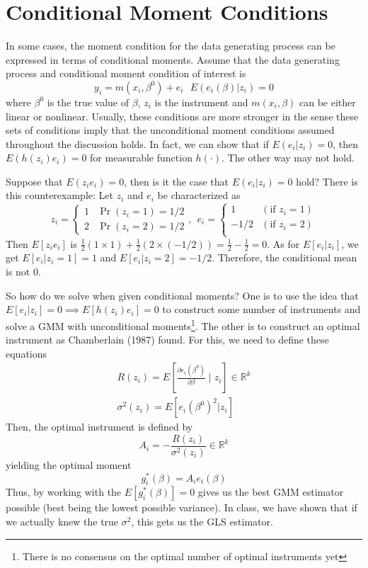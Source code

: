 \section{Conditional Moment Conditions}
In some cases, the moment condition for the data generating process can be expressed in terms of conditional moments. Assume that the data generating process and conditional moment condition of interest is
\[ 
y_i =m( x_i,\beta^0 )+ e_i \ \ \ E(e_i(\beta)|z_i)=0
\]
where $\beta^0$ is the true value of $\beta$, $z_i$ is the instrument and $m(x_i,\beta)$ can be either linear or nonlinear. Usually, these conditions are more stronger in the sense these sets of conditions imply that the unconditional moment conditions assumed throughout the discussion holds. In fact, we can show that if $E(e_i|z_i)=0$, then $E(h(z_i)e_i)=0$ for measurable function $h(\cdot)$. The other way may not hold.
\begin{mdframed}[backgroundcolor=yellow!5] 
\begin{example} Suppose that $E(z_ie_i)=0$, then is it the case that $E(e_i|z_i)=0$ hold? There is this counterexample: Let $z_i$ and $e_i$ be characterized as
\[
z_i=\begin{cases} 1 & \Pr(z_i=1)=1/2 \\ 2 & \Pr(z_i=2)=1/2 \end{cases}, \ \  e_i = \begin{cases} 1 & (\text{if }z_i=1)\\ -1/2 & (\text{if }z_i=2)\\\end{cases}
\]
Then $E[z_ie_i]$  is $\frac{1}{2}(1\times 1) +  \frac{1}{2}(2\times (-1/2))= \frac{1}{2}-\frac{1}{2}=0$. As for $E[e_i|z_i]$, we get $E[e_i|z_i=1]=1$ and $E[e_i|z_i=2]=-1/2$. Therefore, the conditional mean is not 0. 
\end{example}
\end{mdframed} \par
So how do we solve when given conditional moments? One is to use the idea that $E[e_i|z_i]=0\implies E[h(z_i)e_i]=0$ to construct some number of instruments and solve a GMM with unconditional moments\footnote{There is no consensus on the optimal number of optimal instruments yet}.  The other is to construct an optimal instrument as Chamberlain (1987) found. For this, we need to define these equations
\begin{gather*}
R(z_i) = E\left[\frac{\partial e_i(\beta^0)}{\partial \beta}\mid z_i\right] \in\mathbb{R}^k \\
\sigma^2(z_i) = E[e_i(\beta^0)^2|z_i]
\end{gather*}
Then, the optimal instrument is defined by
\[
A_i = -\frac{R(z_i)}{\sigma^2(z_i)}\in\mathbb{R}^k
\]
yielding the optimal moment
\[
g^*_i(\beta) = A_i e_i(\beta)
\]
Thus, by working with the $E[g^*_i(\beta)]=0$ gives us the best GMM estimator possible (best being the lowest possible variance). In class, we have shown that if we actually knew the true $\sigma^2$, this gets us the GLS estimator.



